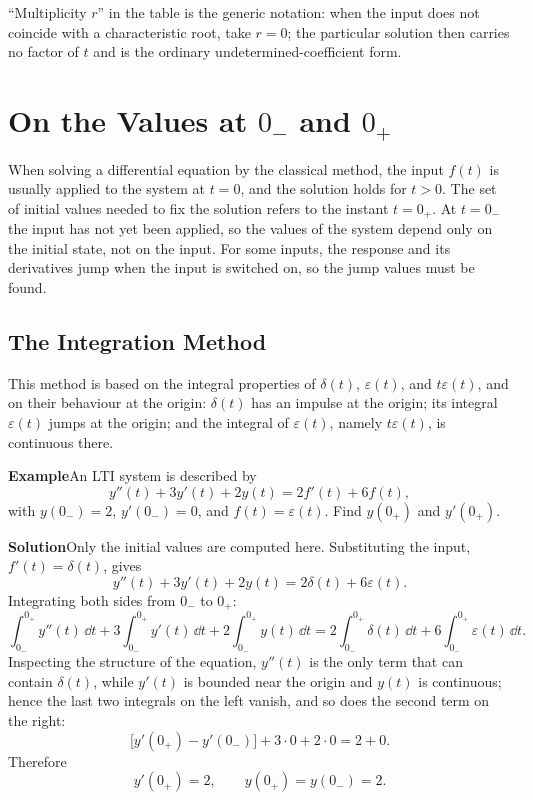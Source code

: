 \begin{note}
``Multiplicity $r$'' in the table is the generic notation: when the input does
not coincide with a characteristic root, take $r=0$; the particular solution
then carries no factor of $t$ and is the ordinary undetermined-coefficient
form.
\end{note}

\section{On the Values at $0_{-}$ and $0_{+}$}

When solving a differential equation by the classical method, the input
$f(t)$ is usually applied to the system at $t=0$, and the solution holds for
$t>0$. The set of initial values needed to fix the solution refers to the
instant $t=0_{+}$. At $t=0_{-}$ the input has not yet been applied, so the
values of the system depend only on the initial state, not on the input. For
some inputs, the response and its derivatives jump when the input is switched
on, so the jump values must be found.

\subsection{The Integration Method}

This method is based on the integral properties of $\delta(t)$,
$\varepsilon(t)$, and $t\varepsilon(t)$, and on their behaviour at the origin:
$\delta(t)$ has an impulse at the origin; its integral $\varepsilon(t)$ jumps
at the origin; and the integral of $\varepsilon(t)$, namely $t\varepsilon(t)$,
is continuous there.

\begin{note}
\textbf{Example}\quad An LTI system is described by
\[
    y''(t)+3y'(t)+2y(t)=2f'(t)+6f(t),
\]
with $y(0_{-})=2$, $y'(0_{-})=0$, and $f(t)=\varepsilon(t)$. Find
$y(0_{+})$ and $y'(0_{+})$.

\textbf{Solution}\quad Only the initial values are computed here.
Substituting the input, $f'(t)=\delta(t)$, gives
\[
    y''(t)+3y'(t)+2y(t)=2\delta(t)+6\varepsilon(t).
\]
Integrating both sides from $0_{-}$ to $0_{+}$:
\[
    \int_{0_{-}}^{0_{+}}y''(t)\,\dd t
    +3\int_{0_{-}}^{0_{+}}y'(t)\,\dd t
    +2\int_{0_{-}}^{0_{+}}y(t)\,\dd t
    =2\int_{0_{-}}^{0_{+}}\delta(t)\,\dd t
    +6\int_{0_{-}}^{0_{+}}\varepsilon(t)\,\dd t .
\]
Inspecting the structure of the equation, $y''(t)$ is the only term that can
contain $\delta(t)$, while $y'(t)$ is bounded near the origin and $y(t)$ is
continuous; hence the last two integrals on the left vanish, and so does the
second term on the right:
\[
    \bigl[y'(0_{+})-y'(0_{-})\bigr]+3\cdot 0+2\cdot 0=2+0 .
\]
Therefore
\[
    y'(0_{+})=2,\qquad y(0_{+})=y(0_{-})=2 .
\]
\end{note}

